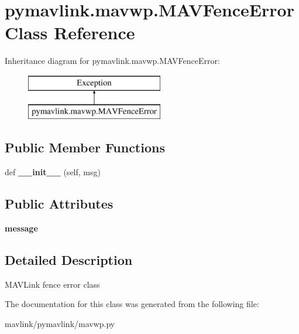 \hypertarget{classpymavlink_1_1mavwp_1_1MAVFenceError}{}\section{pymavlink.\+mavwp.\+M\+A\+V\+Fence\+Error Class Reference}
\label{classpymavlink_1_1mavwp_1_1MAVFenceError}
Inheritance diagram for pymavlink.\+mavwp.\+M\+A\+V\+Fence\+Error\+:\begin{figure}[H]
\begin{center}
\leavevmode
\includegraphics[height=2.000000cm]{classpymavlink_1_1mavwp_1_1MAVFenceError}
\end{center}
\end{figure}
\subsection*{Public Member Functions}
\begin{DoxyCompactItemize}
\item 
\mbox{\label{classpymavlink_1_1mavwp_1_1MAVFenceError_aabdf0e25a42b3bd0429299ba0f041280}} 
def {\bfseries \+\_\+\+\_\+init\+\_\+\+\_\+} (self, msg)
\end{DoxyCompactItemize}
\subsection*{Public Attributes}
\begin{DoxyCompactItemize}
\item 
\mbox{\label{classpymavlink_1_1mavwp_1_1MAVFenceError_aa94a26ad55aed2b325444967ea283e95}} 
{\bfseries message}
\end{DoxyCompactItemize}


\subsection{Detailed Description}
\begin{DoxyVerb}MAVLink fence error class\end{DoxyVerb}
 

The documentation for this class was generated from the following file\+:\begin{DoxyCompactItemize}
\item 
mavlink/pymavlink/mavwp.\+py\end{DoxyCompactItemize}
